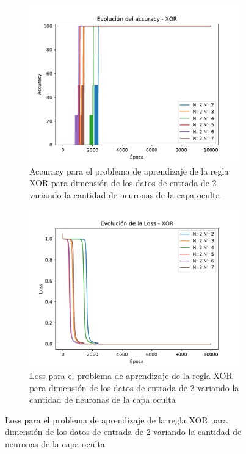 \begin{figure}[H]
     \centering
     \begin{subfigure}[b]{0.45\textwidth}
         \centering
         \includegraphics[width=\textwidth]{image/NvsNp_acc.pdf}
         \caption{Accuracy para el problema de aprendizaje de la regla XOR para dimensión de los datos de entrada de 2 variando la cantidad de neuronas de la capa oculta}
         \label{fig:acc6a}
     \end{subfigure}
     \hfill
     \begin{subfigure}[b]{0.45\textwidth}
         \centering
         \includegraphics[width=\textwidth]{image/NvsNp_loss.pdf}
         \caption{Loss para el problema de aprendizaje de la regla XOR  para dimensión de los datos de entrada de 2 variando la cantidad de neuronas de la capa oculta}
         \label{fig:loss6a}
     \end{subfigure}
\end{figure}

